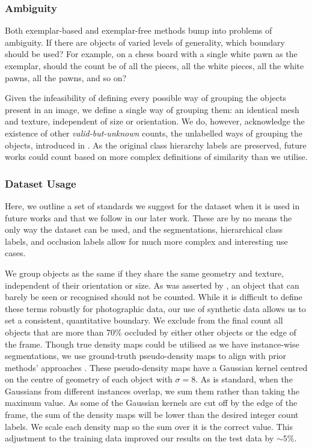 \documentclass[../thesis.tex]{subfiles}
\begin{document}


\subsubsection{Ambiguity}
Both exemplar-based and exemplar-free methods bump into problems of ambiguity. If there are objects of varied levels of generality, which boundary should be used? 
For example, on a chess board with a single white pawn as the exemplar, should the count be of all the pieces, all the white pieces, all the white pawns, all the pawns, and so on? 

Given the infeasibility of defining every possible way of grouping the objects present in an image, we define a single way of grouping them: an identical mesh and texture, independent of size or orientation. 
We do, however, acknowledge the existence of other 
\textit{valid-but-unknown} counts, the unlabelled ways of grouping the objects, introduced in . 
As the original class hierarchy labels are preserved, future works could count based on more complex definitions of similarity than we utilise.

\subsubsection{Dataset Usage}\label{sec__MCAC__usingMCAC}
Here, we outline a set of standards we suggest for the dataset when it is used in future works and that we follow in our later work. These are by no means the only way the dataset can be used, and the segmentations, hierarchical class labels, and occlusion labels allow for much more complex and interesting use cases.


We group objects as the same if they share the same geometry and texture, independent of their orientation or size.
As was asserted by \citet{ranjan2021Famnet}, an object that can barely be seen or recognised should not be counted. While it is difficult to define these terms robustly for photographic data, our use of synthetic data allows us to set a consistent, quantitative boundary. We exclude from the final count all objects that are more than 70\% occluded by either other objects or the edge of the frame. 
Though true density maps could be utilised as we have instance-wise segmentations,  we use ground-truth pseudo-density maps to align with prior methods' approaches \cite{ranjan2021Famnet, liu2022countr, yang2021cfoc, lin2021object}. These pseudo-density maps have a Gaussian kernel centred on the centre of geometry of each object with $\sigma = 8$.
As is standard, when the Gaussians from different instances overlap, we sum them rather than taking the maximum value. 
As some of the Gaussian kernels are cut off by the edge of the frame, the sum of the density maps will be lower than the desired integer count labels.
We scale each density map so the sum over it is the correct value. This adjustment to the training data improved our results on the test data by $\sim5\%$.
\end{document}
